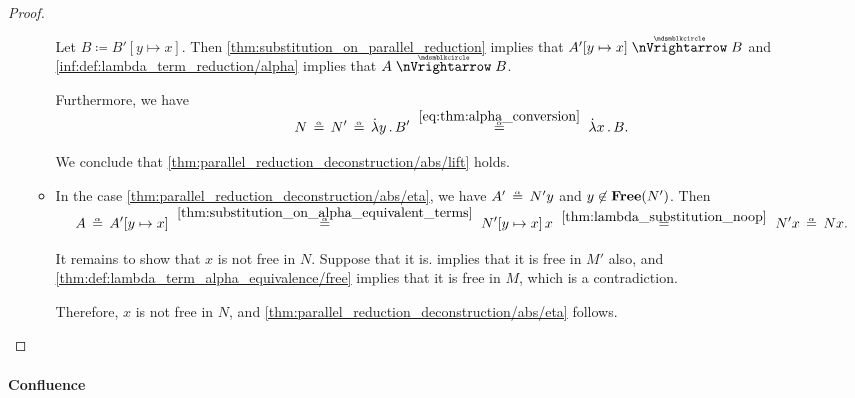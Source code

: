 \begin{proof}
\begin{itemize}
\begin{itemize}
      Let \( B \coloneqq B'[y \mapsto x] \). Then \cref{thm:substitution_on_parallel_reduction} implies that \( A'[y \mapsto x] \ppred B \) and \ref{inf:def:lambda_term_reduction/alpha} implies that \( A \ppred B \).

      Furthermore, we have
      \begin{equation*}
        N
        \aequiv
        N'
        \aequiv
        \qabs y B'
        \reloset {\eqref{eq:thm:alpha_conversion}} \aequiv
        \qabs x B.
      \end{equation*}

      We conclude that \cref{thm:parallel_reduction_deconstruction/abs/lift} holds.

      \item In the case \cref{thm:parallel_reduction_deconstruction/abs/eta}, we have \( A' \aequiv N'y \) and \( y \not\in \op*{Free}(N') \). Then
      \begin{equation*}
        A
        \aequiv
        A'[y \mapsto x]
        \reloset {\ref{thm:substitution_on_alpha_equivalent_terms}} \aequiv
        N'[y \mapsto x] \thinspace x
        \reloset {\ref{thm:lambda_substitution_noop}} =
        N' x
        \aequiv
        N x.
      \end{equation*}

      It remains to show that \( x \) is not free in \( N \). Suppose that it is.  implies that it is free in \( M' \) also, and \cref{thm:def:lambda_term_alpha_equivalence/free} implies that it is free in \( M \), which is a contradiction.

      Therefore, \( x \) is not free in \( N \), and \cref{thm:parallel_reduction_deconstruction/abs/eta} follows.
    \end{itemize}
  \end{itemize}
\end{proof}

\paragraph{Confluence}

